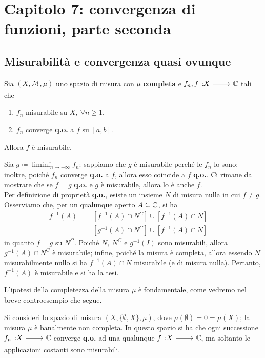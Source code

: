\section{Capitolo 7: convergenza di funzioni, parte seconda}
\subsection{Misurabilità e convergenza quasi ovunque}
\begin{proposition}\label{funzionimisurabiliqo}
	Sia $\left(X,\mathcal{M},\mu\right)$ uno spazio di misura con $\mu$ \textbf{completa} e $\funz{f_n,f}{X}{\complexset}$ tali che
	\begin{enumerate}
		\item $f_n$ misurabile su $X,\ \forall n\geq 1$.
		\item $f_n$ converge \textbf{q.o.} a $f$ su $\left[a,b\right]$.
	\end{enumerate}
	Allora $f$ è misurabile.
\end{proposition}
\begin{demonstration}
	Sia $\displaystyle g\coloneqq \liminf_{n\to+\infty}f_n$: sappiamo che $g$ è misurabile perché le $f_n$ lo sono; inoltre, poiché $f_n$ converge \textbf{q.o.} a $f$, allora esso coincide a $f$ \textbf{q.o.}. Ci rimane da mostrare che se $f=g$ \textbf{q.o.} e $g$ è misurabile, allora lo è anche $f$.\\
	Per definizione di proprietà \textbf{q.o.}, esiste un insieme $N$ di misura nulla in cui $f\neq g$. Osserviamo che, per un qualunque aperto $A\subseteq\mathbb{C}$, si ha
	\begin{align*}
		f^{-1}(A)&=\left[f^{-1}(A)\cap N^C\right]\cup\left[f^{-1}(A)\cap N\right]=\\
		&=\left[g^{-1}(A)\cap N^C\right]\cup\left[f^{-1}(A)\cap N\right]
	\end{align*}
	in quanto $f=g$ su $N^C$. Poiché $N,\ N^C$ e $g^{-1}(I)$ sono misurabili, allora $g^{-1}(A)\cap N^C$ è misurabile; infine, poiché la misura è completa, allora essendo $N$ misurabilmente nullo si ha $f^{-1}(A)\cap N$ misurabile (e di misura nulla). Pertanto, $f^{-1}(A)$ è misurabile e si ha la tesi.
\end{demonstration}
L'ipotesi della completezza della misura $\mu$ è fondamentale, come vedremo nel breve controesempio che segue.
\begin{example}
	Si consideri lo spazio di misura $\left(X,\{\emptyset,X\},\mu\right)$, dove $\mu(\emptyset)=0=\mu(X)$; la misura $\mu$ è banalmente non completa. In questo spazio si ha che ogni successione $\funz{f_n}{X}{\complexset}$ converge \textbf{q.o.} ad una qualunque $\funz{f}{X}{\complexset}$, ma soltanto le applicazioni costanti sono misurabili.
\end{example}